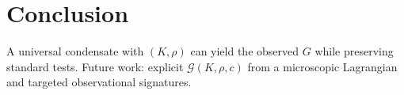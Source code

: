 
\section{Conclusion}
A universal condensate with $(K,\rho)$ can yield the observed $G$ while preserving standard tests. Future work: explicit $\mathcal{G}(K,\rho,c)$ from a microscopic Lagrangian and targeted observational signatures.
